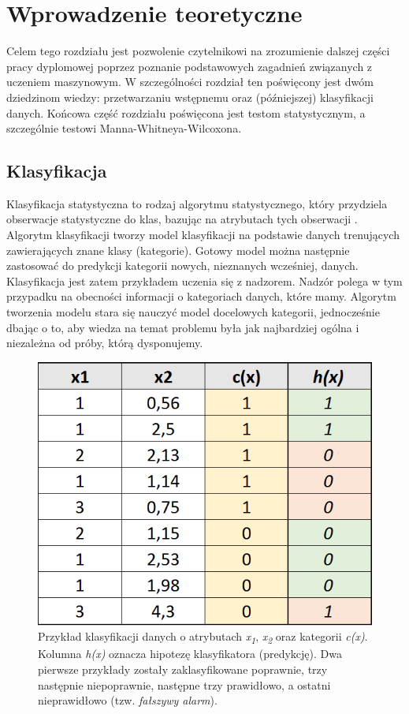 \documentclass[../thesis.tex]{subfiles}
\begin{document}
\pagestyle{plain}
\chapter{Wprowadzenie teoretyczne}

Celem tego rozdziału jest pozwolenie czytelnikowi na zrozumienie dalszej części pracy dyplomowej poprzez poznanie podstawowych zagadnień związanych z uczeniem maszynowym. W szczególności rozdział ten poświęcony jest dwóm dziedzinom wiedzy: przetwarzaniu wstępnemu oraz (późniejszej) klasyfikacji danych. Końcowa część rozdziału poświęcona jest testom statystycznym, a szczególnie testowi Manna-Whitneya-Wilcoxona.

\section{Klasyfikacja}

Klasyfikacja statystyczna to rodzaj algorytmu statystycznego, który przydziela obserwacje statystyczne do klas, bazując na atrybutach tych obserwacji \cite{def_classification}. Algorytm klasyfikacji tworzy model klasyfikacji na podstawie danych trenujących zawierających znane klasy (kategorie). Gotowy model można następnie zastosować  do predykcji kategorii nowych, nieznanych wcześniej, danych. Klasyfikacja jest zatem przykładem uczenia się z nadzorem. Nadzór polega w tym przypadku na obecności informacji o kategoriach danych, które mamy. Algorytm tworzenia modelu stara się nauczyć model docelowych kategorii, jednocześnie dbając o to, aby wiedza na temat problemu była jak najbardziej ogólna i niezależna od próby, którą dysponujemy.

\begin{figure}[h]
\centering
\includegraphics[height=.2\textheight]{classification.png}
\caption{Przykład klasyfikacji danych o atrybutach \emph{x\textsubscript{1}}, \emph{x\textsubscript{2}} oraz kategorii \emph{c(x)}. Kolumna \emph{h(x)} oznacza hipotezę klasyfikatora (predykcję). Dwa pierwsze przykłady zostały zaklasyfikowane poprawnie, trzy następnie niepoprawnie, następne trzy prawidłowo, a ostatni nieprawidłowo (tzw. \emph{fałszywy alarm}). }
\label{classification:basic}
\end{figure}
\end{document}
